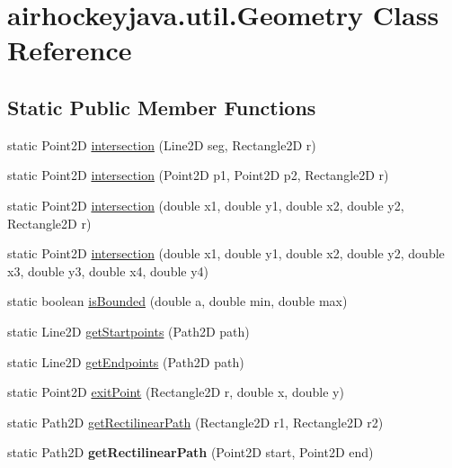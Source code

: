 \hypertarget{classairhockeyjava_1_1util_1_1_geometry}{}\section{airhockeyjava.\+util.\+Geometry Class Reference}
\label{classairhockeyjava_1_1util_1_1_geometry}
\subsection*{Static Public Member Functions}
\begin{DoxyCompactItemize}
\item 
static Point2\+D \hyperlink{classairhockeyjava_1_1util_1_1_geometry_a9f1a4995e82f11e0a7523d1a61d14168}{intersection} (Line2\+D seg, Rectangle2\+D r)
\item 
static Point2\+D \hyperlink{classairhockeyjava_1_1util_1_1_geometry_a9952fdf877483918292568cc4fb66f43}{intersection} (Point2\+D p1, Point2\+D p2, Rectangle2\+D r)
\item 
static Point2\+D \hyperlink{classairhockeyjava_1_1util_1_1_geometry_a47eaacf6e4413de59afcd26650d2ef45}{intersection} (double x1, double y1, double x2, double y2, Rectangle2\+D r)
\item 
static Point2\+D \hyperlink{classairhockeyjava_1_1util_1_1_geometry_a133cc153d210853c81c2475654d99fb5}{intersection} (double x1, double y1, double x2, double y2, double x3, double y3, double x4, double y4)
\item 
static boolean \hyperlink{classairhockeyjava_1_1util_1_1_geometry_a185a7c084e107744da8bd5a47e06f9ae}{is\+Bounded} (double a, double min, double max)
\item 
static Line2\+D \hyperlink{classairhockeyjava_1_1util_1_1_geometry_ad06c1990d774105f200c375a8353ce32}{get\+Startpoints} (Path2\+D path)
\item 
static Line2\+D \hyperlink{classairhockeyjava_1_1util_1_1_geometry_af9088ca58bd8144b057d0743d7483bbf}{get\+Endpoints} (Path2\+D path)
\item 
static Point2\+D \hyperlink{classairhockeyjava_1_1util_1_1_geometry_a2e2b6c309f15cb6e9a2a5e341eb4fc04}{exit\+Point} (Rectangle2\+D r, double x, double y)
\item 
static Path2\+D \hyperlink{classairhockeyjava_1_1util_1_1_geometry_ae059f1d0a55b3b3e00fba3884a44a22a}{get\+Rectilinear\+Path} (Rectangle2\+D r1, Rectangle2\+D r2)
\item 
\hypertarget{classairhockeyjava_1_1util_1_1_geometry_a69dc3ebfcd3dff454ef53a673ce4748c}{}static Path2\+D {\bfseries get\+Rectilinear\+Path} (Point2\+D start, Point2\+D end)\label{classairhockeyjava_1_1util_1_1_geometry_a69dc3ebfcd3dff454ef53a673ce4748c}


\end{DoxyCompactItemize}
